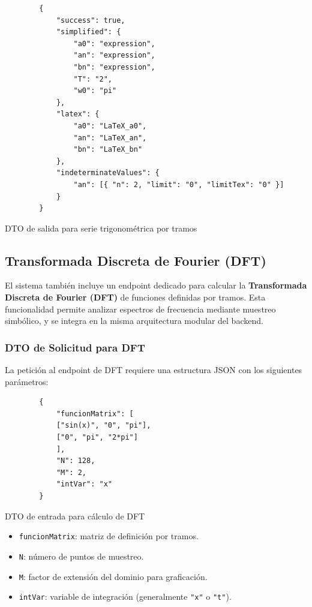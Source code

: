 \begin{listing}[H]
\begin{verbatim}
		{
			"success": true,
			"simplified": {
				"a0": "expression",
				"an": "expression",
				"bn": "expression",
				"T": "2",
				"w0": "pi"
			},
			"latex": {
				"a0": "LaTeX_a0",
				"an": "LaTeX_an",
				"bn": "LaTeX_bn"
			},
			"indeterminateValues": {
				"an": [{ "n": 2, "limit": "0", "limitTex": "0" }]
			}
		}
	\end{verbatim}
	\caption{DTO de salida para serie trigonométrica por tramos}
	\label{lst:piecewise-response}
\end{listing}

\subsection{Transformada Discreta de Fourier (DFT)}

El sistema también incluye un endpoint dedicado para calcular la \textbf{Transformada Discreta de Fourier (DFT)} de funciones definidas por tramos. Esta funcionalidad permite analizar espectros de frecuencia mediante muestreo simbólico, y se integra en la misma arquitectura modular del backend.

\subsubsection*{DTO de Solicitud para DFT}

La petición al endpoint de DFT requiere una estructura JSON con los siguientes parámetros:

\begin{listing}[H]
	\begin{verbatim}
		{
			"funcionMatrix": [
			["sin(x)", "0", "pi"],
			["0", "pi", "2*pi"]
			],
			"N": 128,
			"M": 2,
			"intVar": "x"
		}
	\end{verbatim}
	\caption{DTO de entrada para cálculo de DFT}
	\label{lst:dft-request}
\end{listing}

\begin{itemize}
	\item \texttt{funcionMatrix}: matriz de definición por tramos.
	\item \texttt{N}: número de puntos de muestreo.
	\item \texttt{M}: factor de extensión del dominio para graficación.
	\item \texttt{intVar}: variable de integración (generalmente \texttt{"x"} o \texttt{"t"}).
\end{itemize}

